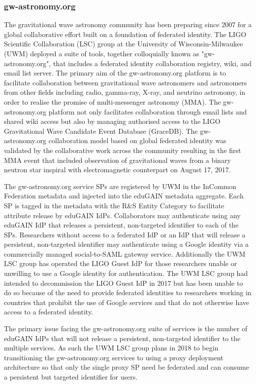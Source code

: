 \documentclass[fleqn,11pt]{wlscirep}
\begin{document}
{\subsubsection{gw-astronomy.org}
The gravitational wave astronomy community has been preparing since 2007 for a global collaborative effort built on a foundation of federated identity. The LIGO Scientific Collaboration (LSC) group at the University of Wisconsin-Milwaukee (UWM) deployed a suite of tools, together colloquially known as "gw-astronomy.org", that includes a federated identity collaboration registry, wiki, and email list server. The primary aim of the gw-astronomy.org platform is to facilitate collaboration between gravitational wave astronomers and astronomers from other fields including radio, gamma-ray, X-ray, and neutrino astronomy, in order to realise the promise of multi-messenger astronomy (MMA). The gw-astronomy.org platform not only facilitates collaboration through email lists and shared wiki access but also by managing authorised access to the LIGO Gravitational Wave Candidate Event Database (GraceDB). The gw-astronomy.org collaboration model based on global federated identity was validated by the collaborative work across the community resulting in the first MMA event that included observation of gravitational waves from a binary neutron star inspiral with electromagnetic counterpart on August 17, 2017.

The gw-astronomy.org service SPs are registered by UWM in the InCommon Federation metadata and injected into the eduGAIN metadata aggregate. Each SP is tagged in the metadata with the R\&S Entity Category to facilitate attribute release by eduGAIN IdPs. Collaborators may authenticate using any eduGAIN IdP that releases a persistent, non-targeted identifier to each of the SPs. Researchers without access to a federated IdP or an IdP that will release a persistent, non-targeted identifier may authenticate using a Google identity via a commercially managed social-to-SAML gateway service. Additionally the UWM LSC group has operated the LIGO Guest IdP for those researchers unable or unwilling to use a Google identity for authentication. The UWM LSC group had intended to decommission the LIGO Guest IdP in 2017 but has been unable to do so because of the need to provide federated identities to researchers working in countries that prohibit the use of Google services and that do not otherwise have access to a federated identity.

The primary issue facing the gw-astronomy.org suite of services is the number of eduGAIN IdPs that will not release a persistent, non-targeted identifier to the multiple services. As such the UWM LSC group plans in 2018 to begin transitioning the gw-astronomy.org services to using a proxy deployment architecture so that only the single proxy SP need be federated and can consume a persistent but targeted identifier for users.


}
\end{document}
